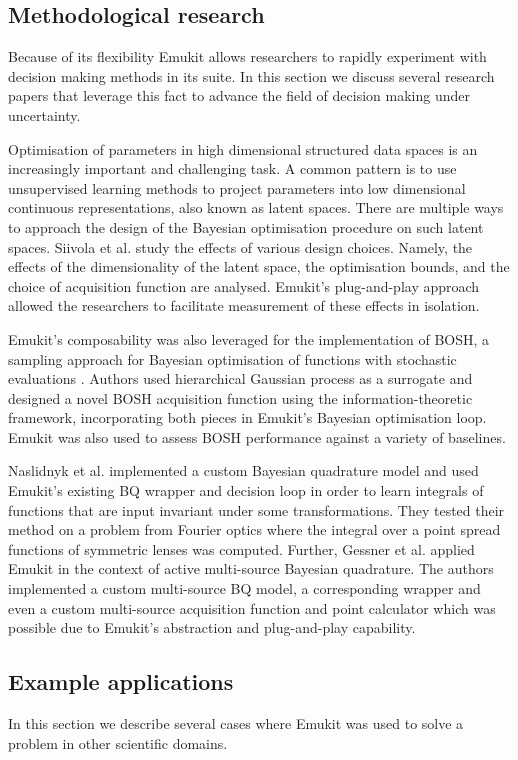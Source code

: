 \subsection{Methodological research}
Because of its flexibility Emukit allows researchers to rapidly experiment with decision making methods in its suite. In this section we discuss several research papers that leverage this fact to advance the field of decision making under uncertainty.

Optimisation of parameters in high dimensional structured data spaces is an increasingly important and challenging task. A common pattern is to use unsupervised learning methods to project parameters into low dimensional continuous representations, also known as latent spaces. There are multiple ways to approach the design of the Bayesian optimisation procedure on such latent spaces. Siivola et al. \cite{siivola2021good} study the effects of various design choices. Namely, the effects of the dimensionality of the latent space, the optimisation bounds, and the choice of acquisition function are analysed. Emukit's plug-and-play approach allowed the researchers to facilitate measurement of these effects in isolation.

Emukit's composability was also leveraged for the implementation of BOSH, a sampling approach for Bayesian optimisation of functions with stochastic evaluations \cite{moss2020bosh}. Authors used hierarchical Gaussian process as a surrogate and designed a novel BOSH acquisition function using the information-theoretic framework, incorporating both pieces in Emukit's Bayesian optimisation loop. Emukit was also used to assess BOSH performance against a variety of baselines.

Naslidnyk et al. \cite{Naslidnyk21} implemented a custom Bayesian quadrature model and used Emukit's existing BQ wrapper and decision loop in order to learn integrals of functions that are input invariant under some transformations. They tested their method on a problem from Fourier optics where the integral over a point spread functions of symmetric lenses was computed. Further, Gessner et al. \cite{Gessner20} applied Emukit in the context of active multi-source Bayesian quadrature. The authors implemented a custom multi-source BQ model, a corresponding wrapper and even a custom multi-source acquisition function and point calculator which was possible due to Emukit's abstraction and plug-and-play capability.

\subsection{Example applications}
In this section we describe several cases where Emukit was used to solve a problem in other scientific domains.

